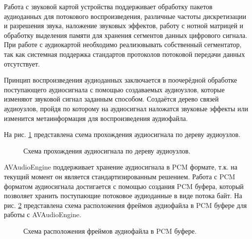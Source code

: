 		\par Работа с звуковой картой устройства \cite{coreaudio} поддерживает обработку пакетов аудиоданных для потокового воспроизведения, различные частоты дискретизации и разрешения звука, наложение звуковых эффектов,
		работу с нотной матрицей и обработку выделения памяти для хранения сегментов данных цифрового сигнала.
		При работе с аудиокартой необходимо реализовывать собственный сегментатор, так как системная поддержка стандартов протоколов потоковой передачи данных отсутствует.

		\par Принцип воспроизведения аудиоданных заключается 
		в поочерёдной обработке поступающего аудиосигнала с помощью создаваемых аудиоузлов, 
		которые изменяют звуковой сигнал заданным способом. Создаётся дерево связей аудиоузлов, 
		пройдя по которому на аудиосигнал наложатся звуковые эффекты или изменится метаинформация для воспроизведения аудиофайла.

		\par На рис. \ref{fig:avplayerengine-nodes} представлена схема прохождения аудиосигнала по дереву аудиоузлов.
		\begin{figure}[!h]
			\caption{Схема прохождения аудиосигнала по дереву аудиоузлов.}
			\label{fig:avplayerengine-nodes}
		\end{figure}

		\par AVAudioEngine поддерживает хранение аудиосигнала в PCM формате, 
		т.к. на текущий момент он является стандартизированным решением.
		Работа с PCM форматом аудиосигнала достигается с помощью создания PCM буфера, 
		который позволяет хранить поступающие потоковое аудиоданные в виде потока байт.
		На рис. \ref{fig:AVPE-PCM-Buffer} представлена схема расположения фреймов аудиофайла в PCM буфере 
		для работы с AVAudioEngine.

		\newpage

		\begin{figure}[!h]
			\caption{Схема расположения фреймов аудиофайла в PCM буфере.}
			\label{fig:AVPE-PCM-Buffer}
		\end{figure}

